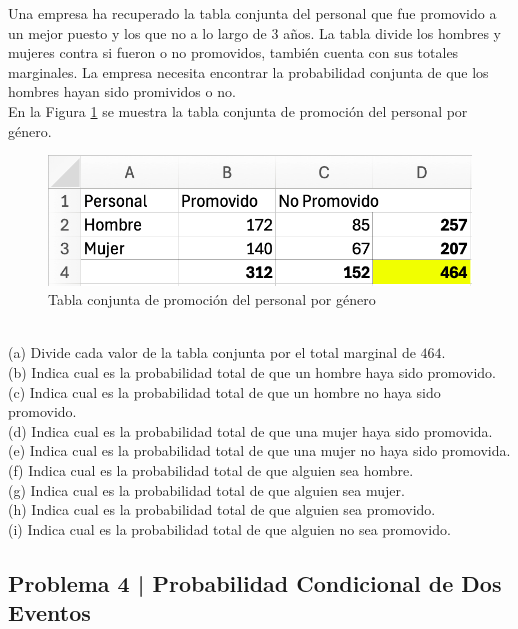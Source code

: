 \documentclass{article}
\begin{document}
Una empresa ha recuperado la tabla conjunta del personal que fue promovido a un mejor puesto y los que no a lo largo de 3 años. La tabla divide los hombres y mujeres contra si fueron o no promovidos, también cuenta con sus totales marginales. La empresa necesita encontrar la probabilidad conjunta de que los hombres hayan sido promividos o no.
\\[12pt]
En la Figura \ref{fig:p203} se muestra la tabla conjunta de promoción del personal por género.
\begin{figure}[!h]
    \centering
    \begin{minipage}{\textwidth}
        \centering
        \includegraphics[width=\textwidth]{figures/p203.png}
    \end{minipage}
    \captionsetup{width=0.9\textwidth}
    \caption{Tabla conjunta de promoción del personal por género}
    \label{fig:p203}
\end{figure}
\\
(a) Divide cada valor de la tabla conjunta por el total marginal de $464$.
\\[6pt]
(b) Indica cual es la probabilidad total de que un hombre haya sido promovido.
\\[6pt]
(c) Indica cual es la probabilidad total de que un hombre no haya sido promovido.
\\[6pt]
(d) Indica cual es la probabilidad total de que una mujer haya sido promovida.
\\[6pt]
(e) Indica cual es la probabilidad total de que una mujer no haya sido promovida.
\\[6pt]
(f) Indica cual es la probabilidad total de que alguien sea hombre.
\\[6pt]
(g) Indica cual es la probabilidad total de que alguien sea mujer.
\\[6pt]
(h) Indica cual es la probabilidad total de que alguien sea promovido.
\\[6pt]
(i) Indica cual es la probabilidad total de que alguien no sea promovido.

\clearpage

\subsection*{Problema 4 | Probabilidad Condicional de Dos Eventos}
\end{document}
